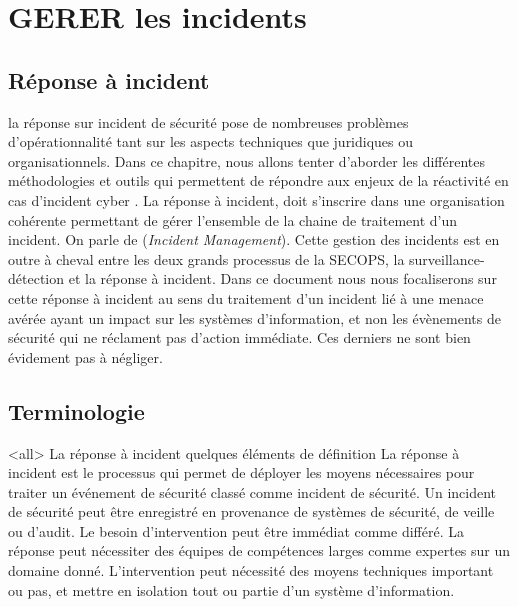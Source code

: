 %
%
\section{GERER les incidents}
\subsection{Réponse à incident}

la réponse sur incident de sécurité pose de nombreuses problèmes d'opérationnalité tant sur les aspects techniques que juridiques ou organisationnels. Dans ce chapitre, nous allons tenter d'aborder les différentes méthodologies et outils qui permettent de répondre aux enjeux de la réactivité en cas d'incident cyber . La réponse à incident, doit s'inscrire dans une organisation cohérente permettant de gérer l'ensemble de la chaine de traitement d'un incident. On parle de  (\textit{Incident Management}). Cette gestion des incidents est en outre à cheval entre les deux grands processus  de la SECOPS, la surveillance-détection et la  réponse à incident. Dans ce document nous nous focaliserons sur cette réponse à incident au sens du traitement d'un incident lié à une menace avérée ayant un impact sur les systèmes d'information, et non les évènements de sécurité qui ne réclament pas d'action immédiate. Ces derniers ne sont bien évidement pas à négliger.

\subsection{Terminologie}

\mode<all>{\texframe
{La réponse à incident}
{quelques éléments de définition}
{%
La réponse à incident est le processus qui permet de déployer les moyens nécessaires pour traiter un événement de sécurité classé comme incident de sécurité.
Un incident de sécurité peut être enregistré en provenance de systèmes de sécurité, de veille ou d'audit. Le besoin d'intervention peut être immédiat comme différé.
La réponse peut nécessiter des équipes de compétences larges comme expertes sur un domaine donné. L'intervention peut nécessité des moyens techniques important ou pas, et mettre en isolation tout ou partie d'un système d'information.
}} %



